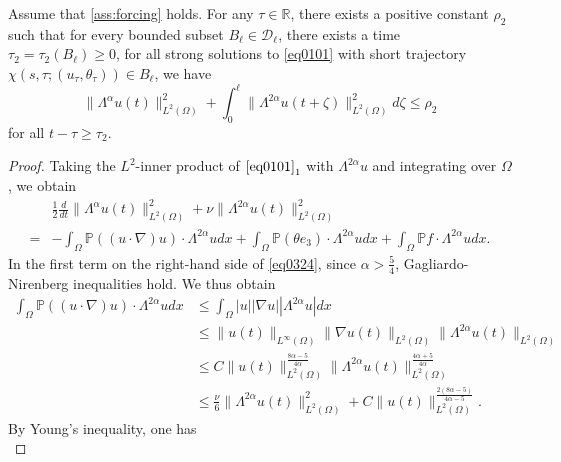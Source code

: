\documentclass[oneside,preprint,12pt,numbers,sort&compress]{elsarticle}
\begin{document}
\begin{lemma}\label{lem0302}
Assume that \cref{ass:forcing} holds. For any $\tau \in \mathbb{R}$, there exists a positive constant $\rho_2$ such that for every bounded subset $B_{\ell} \in \mathcal{D}_{\ell}$, there exists a time $\tau_2 =\tau_2(B_{\ell}) \geq 0 $, for all strong solutions to \cref{eq0101} with short trajectory $\chi(s,\tau; (u_\tau, \theta_\tau)) \in B_{\ell}$, we have 
\[
\| \Lambda^{\alpha} u(t)\|_{L^2(\Omega)}^{2}
+ \int_{0}^{\ell} \| \Lambda^{2\alpha} u(t+\zeta) \|_{L^2(\Omega)}^{2} d\zeta 
\leq \rho_2 
\]
for all $t-\tau \geq \tau_2$.
\end{lemma}
\begin{proof}
Taking the $L^{2}$-inner product of $\eqref{eq0101}_{1}$ with $\Lambda^{2\alpha}u$ and integrating over $\Omega$, we obtain 
\begin{equation}\label{eq0324}
\begin{aligned}
  &\frac{1}{2}\frac{d}{dt}\| \Lambda^{\alpha}u(t) \|_{L^2(\Omega)}^{2}
  +\nu \| \Lambda^{2\alpha} u(t) \|_{L^2(\Omega)}^{2} \\
  = & -\int_{\Omega} \mathbb{P} \left( (u \cdot \nabla) u \right) \cdot \Lambda^{2\alpha} u dx 
  +\int_{\Omega} \mathbb{P} (\theta e_3) \cdot \Lambda^{2\alpha} u dx
  +\int_{\Omega} \mathbb{P} f \cdot \Lambda^{2\alpha} u dx.
\end{aligned}
\end{equation}
In the first term on the right-hand side of \cref{eq0324}, since $\alpha>\frac{5}{4}$, Gagliardo-Nirenberg inequalities hold. We thus obtain
\begin{equation}\label{eq0325}
\begin{aligned}
  \int_{\Omega} \mathbb{P} \left( (u \cdot \nabla) u \right) \cdot \Lambda^{2\alpha} u dx
  & \leq \int_{\Omega} |u|
   |\nabla u|
   |\Lambda^{2\alpha} u| dx 
   \\
  & \leq \|u(t)\|_{L^\infty(\Omega)}
  \|\nabla u(t)\|_{L^2(\Omega)}
  \|\Lambda^{2\alpha} u(t)\|_{L^2(\Omega)}
  \\
  & \leq C \|u(t)\|_{L^2(\Omega)}^{\frac{8\alpha-5}{4\alpha}}
  \|\Lambda^{2\alpha} u(t)\|_{L^2(\Omega)}^{\frac{4\alpha+5}{4\alpha}}
  \\
  & \leq \frac{\nu}{6} \|\Lambda^{2\alpha} u(t)\|_{L^2(\Omega)}^{2}+ C
  \|u(t)\|_{L^2(\Omega)}^{\frac{2(8\alpha-5)}{4\alpha-5}}.
\end{aligned}
\end{equation}
By Young's inequality, one has
\begin{equation}\label{eq0326}

\end{equation}
\end{proof}
\end{document}
